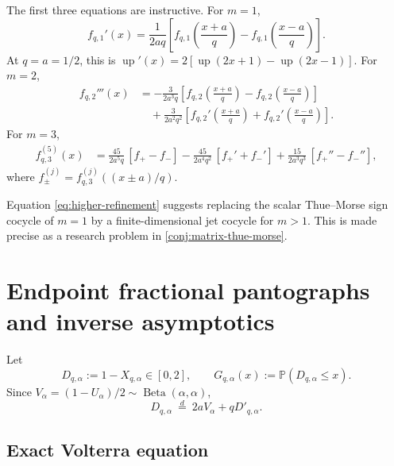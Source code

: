 \documentclass[11pt]{article}
\theoremstyle{definition}
\theoremstyle{remark}
\newcommand{\Prob}{\mathbb{P}}
\newcommand{\upf}{\operatorname{up}}
\begin{document}
The first three equations are instructive.  For \(m=1\),
\begin{equation}
 f_{q,1}'(x)=\frac1{2aq}
 \left[f_{q,1}\left(\frac{x+a}{q}\right)
 -f_{q,1}\left(\frac{x-a}{q}\right)\right].
 \label{eq:m1-refinement}
\end{equation}
At \(q=a=1/2\), this is
\(\upf'(x)=2[\upf(2x+1)-\upf(2x-1)]\).
For \(m=2\),
\begin{equation}
\begin{aligned}
 f_{q,2}'''(x)
 &=-\frac{3}{2a^3q}
 \left[f_{q,2}\left(\frac{x+a}{q}\right)
 -f_{q,2}\left(\frac{x-a}{q}\right)\right]\\
 &\quad+\frac{3}{2a^2q^2}
 \left[f_{q,2}'\left(\frac{x+a}{q}\right)
 +f_{q,2}'\left(\frac{x-a}{q}\right)\right].
 \label{eq:m2-refinement}
\end{aligned}
\end{equation}
For \(m=3\),
\begin{equation}
\begin{aligned}
 f_{q,3}^{(5)}(x)
 &=\frac{45}{2a^5q}\,[f_+-f_-]
 -\frac{45}{2a^4q^2}\,[f_+'+f_-']
 +\frac{15}{2a^3q^3}\,[f_+''-f_-''],
 \label{eq:m3-refinement}
\end{aligned}
\end{equation}
where \(f_\pm^{(j)}=f_{q,3}^{(j)}((x\pm a)/q)\).

Equation \eqref{eq:higher-refinement} suggests replacing the scalar
Thue--Morse sign cocycle of \(m=1\) by a finite-dimensional jet cocycle for
\(m>1\).  This is made precise as a research problem in
\cref{conj:matrix-thue-morse}.

\section{Endpoint fractional pantographs and inverse asymptotics}
\label{sec:endpoint}

Let
\begin{equation}
 D_{q,\alpha}:=1-X_{q,\alpha}\in[0,2],
 \qquad
 G_{q,\alpha}(x):=\Prob(D_{q,\alpha}\le x).
 \label{eq:endpoint-def}
\end{equation}
Since \(V_\alpha=(1-U_\alpha)/2\sim\operatorname{Beta}(\alpha,\alpha)\),
\begin{equation}
 D_{q,\alpha}\ \overset d=\ 2aV_\alpha+qD'_{q,\alpha}.
 \label{eq:endpoint-fixed-point}
\end{equation}

\subsection{Exact Volterra equation}
\end{document}
